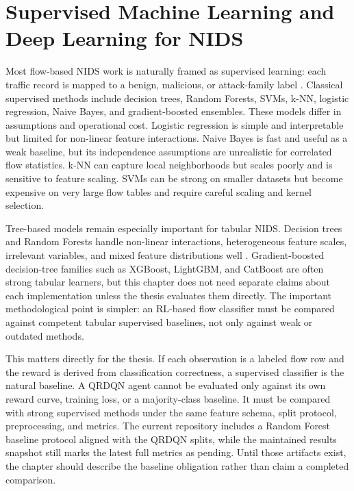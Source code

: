 \section{Supervised Machine Learning and Deep Learning for NIDS}

Most flow-based NIDS work is naturally framed as supervised learning: each traffic record is mapped to a benign, malicious, or attack-family label \parencite{LiuLang2019IDSSurvey,Ahmad2021}. Classical supervised methods include decision trees, Random Forests, SVMs, k-NN, logistic regression, Naive Bayes, and gradient-boosted ensembles. These models differ in assumptions and operational cost. Logistic regression is simple and interpretable but limited for non-linear feature interactions. Naive Bayes is fast and useful as a weak baseline, but its independence assumptions are unrealistic for correlated flow statistics. k-NN can capture local neighborhoods but scales poorly and is sensitive to feature scaling. SVMs can be strong on smaller datasets but become expensive on very large flow tables and require careful scaling and kernel selection.

Tree-based models remain especially important for tabular NIDS. Decision trees and Random Forests handle non-linear interactions, heterogeneous feature scales, irrelevant variables, and mixed feature distributions well \parencite{LiuLang2019IDSSurvey,Apruzzese2022CrossEvaluationNIDS}. Gradient-boosted decision-tree families such as XGBoost, LightGBM, and CatBoost are often strong tabular learners, but this chapter does not need separate claims about each implementation unless the thesis evaluates them directly. The important methodological point is simpler: an RL-based flow classifier must be compared against competent tabular supervised baselines, not only against weak or outdated methods.

This matters directly for the thesis. If each observation is a labeled flow row and the reward is derived from classification correctness, a supervised classifier is the natural baseline. A QRDQN agent cannot be evaluated only against its own reward curve, training loss, or a majority-class baseline. It must be compared with strong supervised methods under the same feature schema, split protocol, preprocessing, and metrics. The current repository includes a Random Forest baseline protocol aligned with the QRDQN splits, while the maintained results snapshot still marks the latest full metrics as pending. Until those artifacts exist, the chapter should describe the baseline obligation rather than claim a completed comparison.

